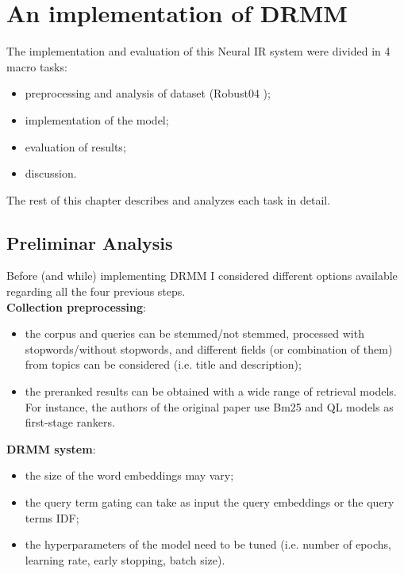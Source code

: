 \newpage
\chapter{An implementation of DRMM}

The implementation and evaluation of this Neural IR system were divided in 4 macro tasks:

\begin{itemize}
\item preprocessing and analysis of dataset (Robust04 \cite{rob04});
\item implementation of the model;
\item evaluation of results;
\item discussion.
\end{itemize}

The rest of this chapter describes and analyzes each task in detail.

\section{Preliminar Analysis}

Before (and while) implementing DRMM I considered different options available regarding all the four previous steps.\\

\textbf{Collection preprocessing}:

\begin{itemize}
 \item the corpus and queries can be stemmed/not stemmed, processed with
stopwords/without stopwords, and different fields (or combination of them) from topics can be considered (i.e. title and description);
 \item the preranked results can be obtained with a wide range of retrieval models. For instance, the authors of the original paper use Bm25 and QL models as first-stage rankers.
\end{itemize}

\textbf{DRMM system}:

\begin{itemize}
 \item the size of the word embeddings may vary;
 \item the query term gating can take as input the query embeddings or the query terms IDF;
 \item the hyperparameters of the model need to be tuned (i.e. number of epochs, learning rate, early stopping, batch size).
\end{itemize}

